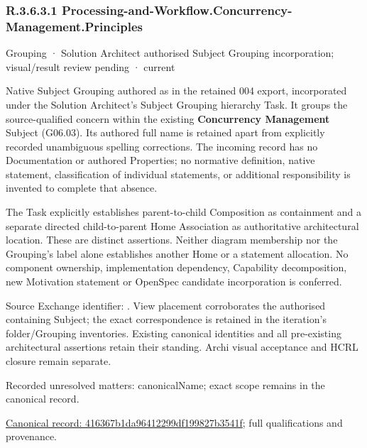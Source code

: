 \subsubsection*{R.3.6.3.1 Processing-and-Workflow.Concurrency-Management.Principles}
\label{navigation:R.3.6.3.1}

\label{element:416367b1da96412299df199827b3541f}
{\small Grouping · Solution Architect authorised Subject Grouping incorporation; visual/result review pending · current}\par

Native Subject Grouping authored as \texttt{} in the retained 004 export,
incorporated under the Solution Architect's Subject Grouping hierarchy Task.
It groups the source-qualified \texttt{} concern within
the existing \textbf{Concurrency Management} Subject (G06.03). Its authored full name
is retained apart from explicitly recorded unambiguous spelling corrections.
The incoming record has no Documentation or authored Properties; no normative
definition, native statement, classification of individual statements, or
additional responsibility is invented to complete that absence.



The Task explicitly establishes parent-to-child Composition as containment and
a separate directed child-to-parent Home Association as authoritative architectural
location. These are distinct assertions. Neither diagram membership nor the
Grouping's label alone establishes another Home or a statement allocation.
No component ownership, implementation dependency, Capability decomposition,
new Motivation statement or OpenSpec candidate incorporation is conferred.



Source Exchange identifier: \texttt{}. View placement corroborates
the authorised containing Subject; the exact correspondence is retained in the
iteration's folder/Grouping inventories. Existing canonical identities and all
pre-existing architectural assertions retain their standing. Archi visual
acceptance and HCRL closure remain separate.


{\small Recorded unresolved matters: canonicalName; exact scope remains in the canonical record.}\par
{\footnotesize \href{../../../../continuum/grouping/416367b1da96412299df199827b3541f.md}{Canonical record: 416367b1da96412299df199827b3541f}; full qualifications and provenance.}\par
